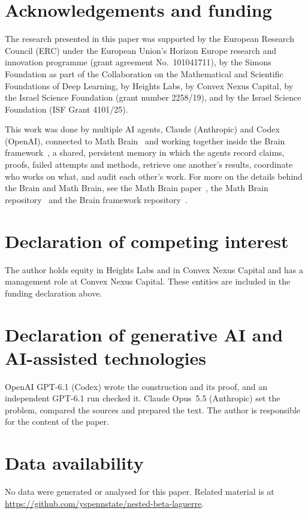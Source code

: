 \documentclass[10pt]{amsart}
\begin{document}
\section*{Acknowledgements and funding}
The research presented in this paper was supported by the European Research
Council (ERC) under the European Union's Horizon Europe research and
innovation programme (grant agreement No.~101041711), by the Simons
Foundation as part of the Collaboration on the Mathematical and Scientific
Foundations of Deep Learning, by Heights Labs, by Convex Nexus Capital, by
the Israel Science Foundation (grant number 2258/19), and by the Israel
Science Foundation (ISF Grant 4101/25).

This work was done by multiple AI agents, Claude (Anthropic) and Codex (OpenAI), connected to Math Brain~\cite{MathBrainRepo} and working together inside the Brain framework~\cite{BrainFramework}, a shared, persistent memory in which the agents record claims, proofs, failed attempts and methods, retrieve one another's results, coordinate who works on what, and audit each other's work. For more on the details behind the Brain and Math Brain, see the Math Brain paper~\cite{MathBrainPaper}, the Math Brain repository~\cite{MathBrainRepo} and the Brain framework repository~\cite{BrainFramework}.

\section*{Declaration of competing interest}
The author holds equity in Heights Labs and in Convex Nexus Capital and
has a management role at Convex Nexus Capital. These entities are included
in the funding declaration above.

\section*{Declaration of generative AI and AI-assisted technologies}
OpenAI GPT-6.1 (Codex) wrote the construction and its proof, and an
independent GPT-6.1 run checked it. Claude Opus~5.5 (Anthropic) set the
problem, compared the sources and prepared the text. The author is
responsible for the content of the paper.

\section*{Data availability}
No data were generated or analysed for this paper. Related material is at
\url{https://github.com/yspennstate/nested-beta-laguerre}.
\end{document}
